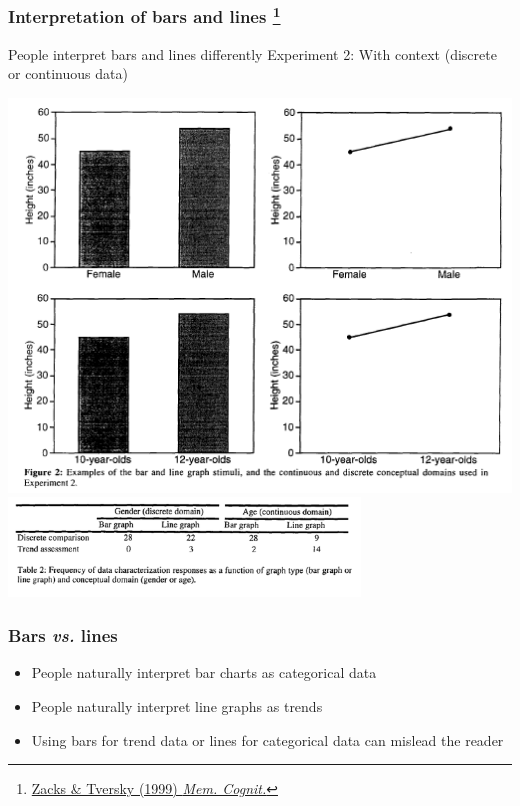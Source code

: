 \begin{frame}
  \frametitle{Interpretation of bars and lines
  \footnote{\tiny{\href{http://link.springer.com/article/10.3758/BF03201236}{Zacks \& Tversky (1999) \textit{Mem. Cognit.}}}}
  }
  \begin{alertblock}{People interpret bars and lines differently}
  Experiment 2: With context (discrete or continuous data)\\
    \begin{center}
      \includegraphics[height=0.4\textheight,valign=t]{images/bars_v_lines_expt2} \\
      \includegraphics[width=0.7\textwidth,valign=t]{images/bars_v_lines_table}  
    \end{center}
  \end{alertblock}
  \begin{center}
  \end{center}
\end{frame}

\begin{frame}
  \frametitle{Bars \textit{ vs.} lines}
    \begin{itemize}  
      \item \textcolor{hutton_green}{People naturally interpret bar charts as categorical data}
      \item \textcolor{hutton_blue}{People naturally interpret line graphs as trends}
      \item \textcolor{hutton_purple}{Using bars for trend data or lines for categorical data can mislead the reader}
    \end{itemize}  
\end{frame}


